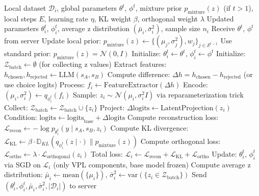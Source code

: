 \begin{algorithm}[!t]
\caption{Client-Side: Local Variational Training}
\label{alg:client}
\begin{small}
\begin{algorithmic}[1]
\REQUIRE Local dataset $\mathcal{D}_i$, global parameters $\theta^t$, $\phi^t$, mixture prior $p_{\text{mixture}}(z)$ (if $t > 1$), local steps $E$, learning rate $\eta$, KL weight $\beta$, orthogonal weight $\lambda$
\ENSURE Updated parameters $\theta_i^t$, $\phi_i^t$, average z distribution $(\bar{\mu}_i, \bar{\sigma}_i^2)$, sample size $n_i$
\STATE Receive $\theta^t$, $\phi^t$ from server
    \STATE Update local prior: $p_{\text{mixture}}(z) \leftarrow \{(\mu_j, \sigma_j^2), w_j\}_{j \in \mathcal{S}^{t-1}}$
\ELSE
    \STATE Use standard prior: $p_{\text{mixture}}(z) = \mathcal{N}(0, I)$
\ENDIF
\STATE Initialize: $\theta_i^t \leftarrow \theta^t$, $\phi_i^t \leftarrow \phi^t$
\STATE Initialize: $\mathcal{Z}_{\text{batch}} \leftarrow \emptyset$ (for collecting z values)
        \STATE Extract features: $h_{\text{chosen}}, h_{\text{rejected}} \leftarrow \text{LLM}(s_A, s_B)$
        \STATE Compute difference: $\Delta h = h_{\text{chosen}} - h_{\text{rejected}}$ (or use choice logits)
        \STATE Process: $f_i \leftarrow \text{FeatureExtractor}(\Delta h)$
        \STATE Encode: $(\mu_i, \sigma_i^2) \leftarrow q_{\phi_i^t}(f_i)$
        \STATE Sample: $z_i \sim \mathcal{N}(\mu_i, \sigma_i^2 I)$ via reparameterization trick
        \STATE Collect: $\mathcal{Z}_{\text{batch}} \leftarrow \mathcal{Z}_{\text{batch}} \cup \{z_i\}$
        \STATE Project: $\Delta \text{logits} \leftarrow \text{LatentProjection}(z_i)$
        \STATE Condition: $\text{logits} \leftarrow \text{logits}_{\text{base}} + \Delta \text{logits}$
        \STATE Compute reconstruction loss: $\mathcal{L}_{\text{recon}} \leftarrow -\log p_{\theta_i^t}(y \mid s_A, s_B, z_i)$
        \STATE Compute KL divergence: $\mathcal{L}_{\text{KL}} \leftarrow \beta \cdot \mathbb{D}_{KL}(q_{\phi_i^t}(z \mid \cdot) \| p_{\text{mixture}}(z))$
        \STATE Compute orthogonal loss: $\mathcal{L}_{\text{ortho}} \leftarrow \lambda \cdot \mathcal{L}_{\text{orthogonal}}(z_i)$
        \STATE Total loss: $\mathcal{L}_i \leftarrow \mathcal{L}_{\text{recon}} + \mathcal{L}_{\text{KL}} + \mathcal{L}_{\text{ortho}}$
        \STATE Update: $\theta_i^t$, $\phi_i^t$ via SGD on $\mathcal{L}_i$ (only VPL components, base model frozen)
    \ENDFOR
\ENDFOR
\STATE Compute average z distribution: $\bar{\mu}_i \leftarrow \text{mean}(\{\mu_i\})$, $\bar{\sigma}_i^2 \leftarrow \text{var}(\{z_i \in \mathcal{Z}_{\text{batch}}\})$
\STATE Send $(\theta_i^t, \phi_i^t, \bar{\mu}_i, \bar{\sigma}_i^2, |\mathcal{D}_i|)$ to server
\end{algorithmic}
\end{small}
\end{algorithm}
